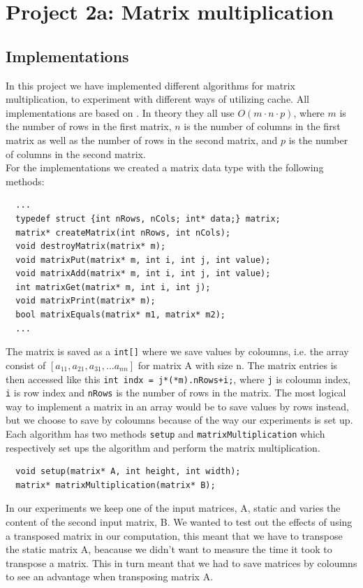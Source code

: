 
\chapter{Project 2a: Matrix multiplication} %

\label{Chapter2} %




\section{Implementations}
In this project we have implemented different algorithms for matrix multiplication, to experiment with different ways of utilizing cache.
All implementations are based on \citep{matrixMultiplication}.
In theory they all use $O(m\cdot n\cdot p)$, where $m$ is the number of rows in the first matrix, $n$ is the number of columns in the first matrix as well as the number of rows in the second matrix, and $p$ is the number of columns in the second matrix.
\\For the implementations we created a matrix data type with the following methods:
\begin{lstlisting}
  ...
  typedef struct {int nRows, nCols; int* data;} matrix;
  matrix* createMatrix(int nRows, int nCols);
  void destroyMatrix(matrix* m);
  void matrixPut(matrix* m, int i, int j, int value);
  void matrixAdd(matrix* m, int i, int j, int value);
  int matrixGet(matrix* m, int i, int j);
  void matrixPrint(matrix* m);
  bool matrixEquals(matrix* m1, matrix* m2);
  ...
\end{lstlisting}
The matrix is saved as a \verb!int[]! where we save values by coloumns, i.e. the array consist of $[a_{11}, a_{21}, a_{31}, ... a_{nn}]$ for matrix A with size n.
The matrix entries is then accessed like this \verb!int indx = j*(*m).nRows+i;!, where \verb!j! is coloumn index, \verb!i! is row index and \verb!nRows! is the number of rows in the matrix.
The most logical way to implement a matrix in an array would be to save values by rows instead, but we choose to save by coloumns because of the way our experiments is set up.
Each algorithm has two methods \verb!setup! and \verb!matrixMultiplication! which respectively set ups the algorithm and perform the matrix multiplication.
\begin{lstlisting}
  void setup(matrix* A, int height, int width);
  matrix* matrixMultiplication(matrix* B);
\end{lstlisting}
In our experiments we keep one of the input matrices, A, static and varies the content of the second input matrix, B. 
We wanted to test out the effects of using a transposed matrix in our computation, this meant that we have to transpose the static matrix A, beacause we didn't want to measure the time it took to transpose a matrix.
This in turn meant that we had to save matrices by coloumns to see an advantage when transposing matrix A. 


